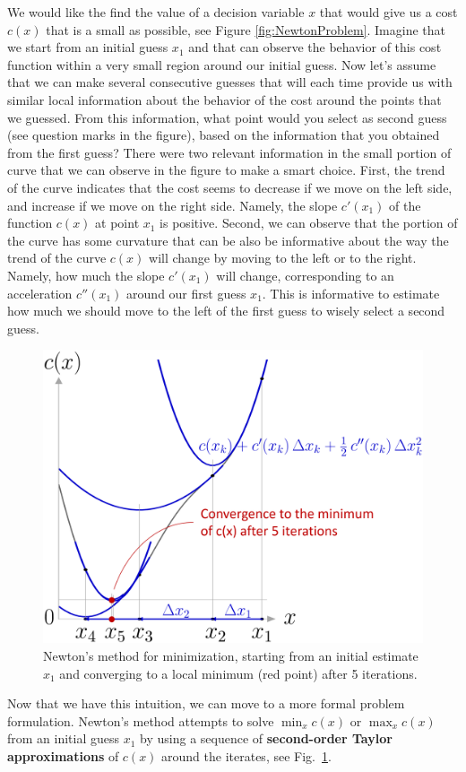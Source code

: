 \documentclass[10pt,a4paper]{article} %
\begin{document}
We would like the find the value of a decision variable $x$ that would give us a cost $c(x)$ that is a small as possible, see Figure \ref{fig:NewtonProblem}. Imagine that we start from an initial guess $x_1$ and that can observe the behavior of this cost function within a very small region around our initial guess. Now let's assume that we can make several consecutive guesses that will each time provide us with similar local information about the behavior of the cost around the points that we guessed. From this information, what point would you select as second guess (see question marks in the figure), based on the information that you obtained from the first guess? There were two relevant information in the small portion of curve that we can observe in the figure to make a smart choice. First, the trend of the curve indicates that the cost seems to decrease if we move on the left side, and increase if we move on the right side. Namely, the slope $c'(x_1)$ of the function $c(x)$ at point $x_1$ is positive. Second, we can observe that the portion of the curve has some curvature that can be also be informative about the way the trend of the curve $c(x)$ will change by moving to the left or to the right. Namely, how much the slope $c'(x_1)$ will change, corresponding to an acceleration $c''(x_1)$ around our first guess $x_1$. This is informative to estimate how much we should move to the left of the first guess to wisely select a second guess. \newline

\begin{figure}
\centering
\includegraphics[width=.42\textwidth]{images/NewtonMethod1D01.png}
\caption{\footnotesize
Newton's method for minimization, starting from an initial estimate $x_1$ and converging to a local minimum (red point) after 5 iterations.
}
\label{fig:Newton}
\end{figure}

Now that we have this intuition, we can move to a more formal problem formulation. Newton's method attempts to solve $\min_x c(x)$ or $\max_x c(x)$ from an initial guess $x_1$ by using a sequence of \textbf{second-order Taylor approximations} of $c(x)$ around the iterates, see Fig.~\ref{fig:Newton}. 
\end{document}
